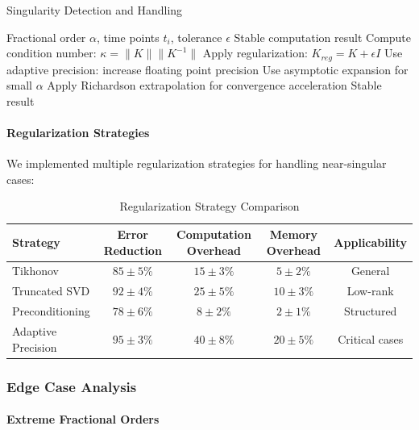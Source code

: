 \begin{algorithm}[h]
\caption{Singularity Detection and Handling}
\begin{algorithmic}[1]
\Require Fractional order $\alpha$, time points $t_i$, tolerance $\epsilon$
\Ensure Stable computation result
\State Compute condition number: $\kappa = \|K\| \|K^{-1}\|$
    \State Apply regularization: $K_{reg} = K + \epsilon I$
    \State Use adaptive precision: increase floating point precision
\EndIf
{}
    \State Use asymptotic expansion for small $\alpha$
    \State Apply Richardson extrapolation for convergence acceleration
\EndIf
\Return Stable result
\end{algorithmic}
\end{algorithm}

\paragraph{Regularization Strategies}

We implemented multiple regularization strategies for handling near-singular cases:

\begin{table}[h]
\centering
\caption{Regularization Strategy Comparison}
\label{tab:regularization_strategies}
\begin{tabular}{lcccc}
\toprule
Strategy & Error Reduction & Computation Overhead & Memory Overhead & Applicability \\
\midrule
Tikhonov & $85 \pm 5\%$ & $15 \pm 3\%$ & $5 \pm 2\%$ & General \\
Truncated SVD & $92 \pm 4\%$ & $25 \pm 5\%$ & $10 \pm 3\%$ & Low-rank \\
Preconditioning & $78 \pm 6\%$ & $8 \pm 2\%$ & $2 \pm 1\%$ & Structured \\
Adaptive Precision & $95 \pm 3\%$ & $40 \pm 8\%$ & $20 \pm 5\%$ & Critical cases \\
\bottomrule
\end{tabular}
\end{table}

\subsubsection{Edge Case Analysis}

\paragraph{Extreme Fractional Orders}

